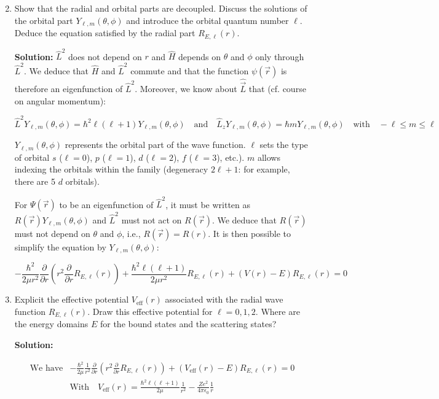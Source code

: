 \documentclass{article}
\begin{document}
\begin{enumerate}
    \setcounter{enumi}{1}
    \item Show that the radial and orbital parts are decoupled. Discuss the solutions of the orbital part $Y_{\ell, m}(\theta, \phi)$ and introduce the orbital quantum number $\ell$. Deduce the equation satisfied by the radial part $R_{E, \ell}(r)$.

    {\color{red}\textbf{Solution:} $\hat{L}^{2}$ does not depend on $r$ and $\hat{H}$ depends on $\theta$ and $\phi$ only through $\hat{L}^{2}$. We deduce that $\hat{H}$ and $\hat{L}^{2}$ commute and that the function $\psi(\vec{r})$ is therefore an eigenfunction of $\hat{L}^{2}$. Moreover, we know about $\hat{\vec{L}}$ that (cf. course on angular momentum):

    $$
    \hat{L}^{2} Y_{\ell, m}(\theta, \phi) = \hbar^{2} \ell(\ell+1) Y_{\ell, m}(\theta, \phi) \quad \text{and} \quad \hat{L}_{z} Y_{\ell, m}(\theta, \phi) = \hbar m Y_{\ell, m}(\theta, \phi) \quad \text{with} \quad -\ell \leq m \leq \ell
    $$

    $Y_{\ell, m}(\theta, \phi)$ represents the orbital part of the wave function. $\ell$ sets the type of orbital $s$ ($\ell=0$), $p$ ($\ell=1$), $d$ ($\ell=2$), $f$ ($\ell=3$), etc.). $m$ allows indexing the orbitals within the family (degeneracy $2 \ell+1$: for example, there are 5 $d$ orbitals).

    For $\Psi(\vec{r})$ to be an eigenfunction of $\hat{L}^{2}$, it must be written as $R(\vec{r}) Y_{\ell, m}(\theta, \phi)$ and $\hat{L}^{2}$ must not act on $R(\vec{r})$. We deduce that $R(\vec{r})$ must not depend on $\theta$ and $\phi$, i.e., $R(\vec{r}) = R(r)$. It is then possible to simplify the equation by $Y_{\ell, m}(\theta, \phi)$:

    $$
    -\frac{\hbar^{2}}{2 \mu r^{2}} \frac{\partial}{\partial r}\left(r^{2} \frac{\partial}{\partial r} R_{E, \ell}(r)\right) + \frac{\hbar^{2} \ell(\ell+1)}{2 \mu r^{2}} R_{E, \ell}(r) + (V(r) - E) R_{E, \ell}(r) = 0
    $$}

    \item Explicit the effective potential $V_{\text{eff}}(r)$ associated with the radial wave function $R_{E, \ell}(r)$. Draw this effective potential for $\ell=0,1,2$. Where are the energy domains $E$ for the bound states and the scattering states?

    {\color{red}\textbf{Solution:}

    $$
    \begin{array}{cl}
    \text{We have} & -\frac{\hbar^{2}}{2 \mu} \frac{1}{r^{2}} \frac{\partial}{\partial r}\left(r^{2} \frac{\partial}{\partial r} R_{E, \ell}(r)\right) + \left(V_{\text{eff}}(r) - E\right) R_{E, \ell}(r) = 0 \\
    & \text{With} \quad V_{\text{eff}}(r) = \frac{\hbar^{2} \ell(\ell+1)}{2 \mu} \frac{1}{r^{2}} - \frac{Z e^{2}}{4 \pi \epsilon_{0}} \frac{1}{r}
    \end{array}
    $$

}
\end{enumerate}
\end{document}
